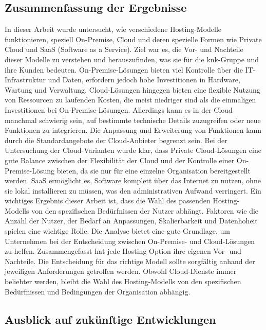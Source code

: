 \documentclass[12pt,bibtotoc]{article}
\begin{document}
		\subsection{Zusammenfassung der Ergebnisse}
		In dieser Arbeit wurde untersucht, wie verschiedene Hosting-Modelle funktionieren, speziell On-Premise, Cloud und deren spezielle Formen wie Private Cloud und SaaS (Software as a Service). Ziel war es, die Vor- und Nachteile dieser Modelle zu verstehen und herauszufinden, was sie für die knk-Gruppe und ihre Kunden bedeuten. \newline
		On-Premise-Lösungen bieten viel Kontrolle über die IT-Infrastruktur und Daten, erfordern jedoch hohe Investitionen in Hardware, Wartung und Verwaltung. Cloud-Lösungen hingegen bieten eine flexible Nutzung von Ressourcen zu laufenden Kosten, die meist niedriger sind als die einmaligen Investitionen bei On-Premise-Lösungen. \newline
		Allerdings kann es in der Cloud manchmal schwierig sein, auf bestimmte technische Details zuzugreifen oder neue Funktionen zu integrieren. Die Anpassung und Erweiterung von Funktionen kann durch die Standardangebote der Cloud-Anbieter begrenzt sein.\newline
		Bei der Untersuchung der Cloud-Varianten wurde klar, dass Private Cloud-Lösungen eine gute Balance zwischen der Flexibilität der Cloud und der Kontrolle einer On-Premise-Lösung bieten, da sie nur für eine einzelne Organisation bereitgestellt werden. SaaS ermöglicht es, Software komplett über das Internet zu nutzen, ohne sie lokal installieren zu müssen, was den administrativen Aufwand verringert. \newline
		Ein wichtiges Ergebnis dieser Arbeit ist, dass die Wahl des passenden Hosting-Modells von den spezifischen Bedürfnissen der Nutzer abhängt. Faktoren wie die Anzahl der Nutzer, der Bedarf an Anpassungen, Skalierbarkeit und Datenhoheit spielen eine wichtige Rolle. Die Analyse bietet eine gute Grundlage, um Unternehmen bei der Entscheidung zwischen On-Premise- und Cloud-Lösungen zu helfen.\newline
		Zusammengefasst hat jede Hosting-Option ihre eigenen Vor- und Nachteile. Die Entscheidung für das richtige Modell sollte sorgfältig anhand der jeweiligen Anforderungen getroffen werden. Obwohl Cloud-Dienste immer beliebter werden, bleibt die Wahl des Hosting-Modells von den spezifischen Bedürfnissen und Bedingungen der Organisation abhängig.
		\subsection{Ausblick auf zukünftige Entwicklungen}
\end{document}
